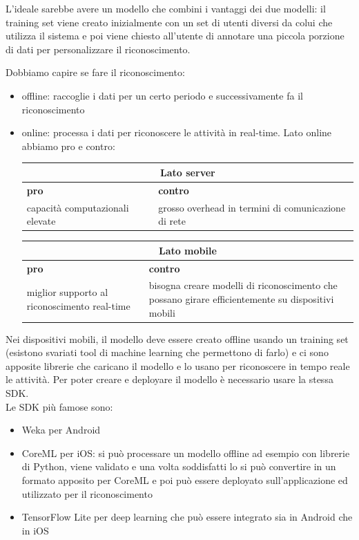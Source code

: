 L'ideale sarebbe avere un modello che combini i vantaggi dei due modelli: il training set viene creato inizialmente con un set di utenti diversi da colui che utilizza il sistema e poi viene chiesto all'utente di annotare una piccola porzione di dati per personalizzare il riconoscimento.

Dobbiamo capire se fare il riconoscimento:
\begin{itemize}
    \item offline: raccoglie i dati per un certo periodo e successivamente fa il riconoscimento
    \item online: processa i dati per riconoscere le attività in real-time. Lato online abbiamo pro e contro:
    
    \begin{table}[!ht]
        \centering
        \begin{tabular}{|p{}|p{}|}
            \hline
            \multicolumn{2}{|c|}{\textbf{Lato server}} \\
            \hline
            \textbf{pro} & \textbf{contro}\\
            \hline
            capacità computazionali elevate & grosso overhead in termini di comunicazione di rete \\
            \hline
        \end{tabular}
    \end{table}
    \begin{table}[!ht]
        \centering
        \begin{tabular}{|p{}|p{}|}
            \hline
            \multicolumn{2}{|c|}{\textbf{Lato mobile}} \\
            \hline
            \textbf{pro} & \textbf{contro}\\
            \hline
            miglior supporto al riconoscimento real-time & bisogna creare modelli di riconoscimento che possano girare efficientemente su dispositivi mobili \\
            \hline
        \end{tabular}
    \end{table}
\end{itemize}

Nei dispositivi mobili, il modello deve essere creato offline usando un training set (esistono svariati tool di machine learning che permettono di farlo) e ci sono apposite librerie che caricano il modello e lo usano per riconoscere in tempo reale le attività. 
Per poter creare e deployare il modello è necessario usare la stessa SDK. 
\\ Le SDK più famose sono:
\begin{itemize}
    \item Weka per Android
    \item CoreML per iOS: si può processare un modello offline ad esempio con librerie di Python, viene validato e una volta soddisfatti lo si può convertire in un formato apposito per CoreML e poi può essere deployato sull'applicazione ed utilizzato per il riconoscimento
    \item TensorFlow Lite per deep learning che può essere integrato sia in Android che in iOS
\end{itemize}

